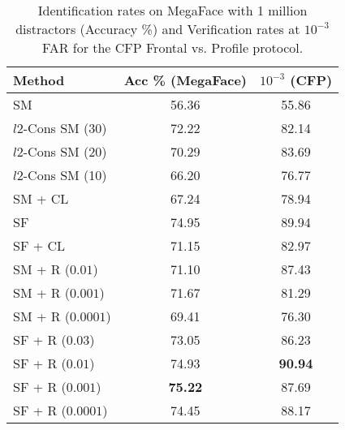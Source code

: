 \documentclass[10pt,twocolumn,letterpaper]{article}
\begin{document}
\begin{table}
\centering
\begin{tabular}{l  c c } %

\hline\hline %
Method   & Acc \% (MegaFace)  &  $10^{-3}$ (CFP)  \\
\hline
\hline


SM    &     56.36  &   55.86   \\
$l2$-Cons SM (30) \cite{ranjan2017l2}   &  72.22 &   82.14   \\ 
$l2$-Cons SM (20) \cite{ranjan2017l2}   &   70.29    &  83.69  \\ 
$l2$-Cons SM (10) \cite{ranjan2017l2}   &   66.20   &   76.77  \\ 
SM + CL \cite{wen2016discriminative}   &  67.24     & 78.94   \\ 
SF   \cite{liu2017sphereface}   &   74.95  &   89.94  \\
SF + CL \cite{wen2016discriminative, liu2017sphereface}  &  71.15  &   82.97 \\


\hline
SM + R  ($0.01$)    &  71.10  &  87.43  \\
SM + R  ($0.001$)   &  71.67 &  81.29  \\
SM + R  ($0.0001$)  &   69.41  &  76.30  \\ 
\hline
SF + R  ($0.03$)   &    73.05 & 86.23    \\ 
SF + R  ($0.01$)   &     74.93  & \textbf{ 90.94}   \\ 
SF + R  ($0.001$)   &   \textbf{ 75.22 } &  87.69   \\ 
SF + R  ($0.0001$)   &   74.45  &   88.17 \\ 





\hline
\end{tabular}
\caption{Identification rates on MegaFace with 1 million distractors (Accuracy \%) and Verification rates at $10^{-3}$ FAR for the CFP Frontal vs. Profile protocol.  }
\label{tab_megaface}

\end{table}
\end{document}
